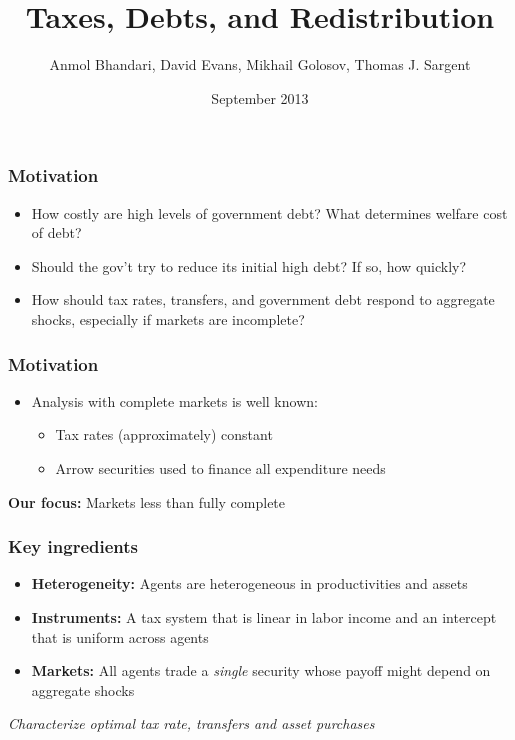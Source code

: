 \documentclass{beamer}
\title {Taxes, Debts,  and Redistribution}
\author{Anmol Bhandari, David Evans, Mikhail Golosov, Thomas J. Sargent}
\date{September 2013}
\begin{document}
%
\begin{frame}
\titlepage

\end{frame}

\begin{frame}
\frametitle{Motivation}

\begin{itemize}
\item How costly are high levels of government debt? What determines welfare cost of debt?
\vspace{2mm}
\item Should the gov't try to reduce its initial high debt? If so, how
quickly?
\vspace{2mm}

\item How should tax rates, transfers, and government debt respond to aggregate shocks, especially if markets are incomplete?
\end{itemize}

\end{frame}

\begin{frame}
\frametitle{Motivation}

\begin{itemize}
\item Analysis with complete markets is well known:

\begin{itemize}
\vspace{2mm}

\item Tax rates (approximately) constant
\vspace{2mm}

\item  Arrow securities used to finance all expenditure needs
\vspace{2mm}

\end{itemize}
\end{itemize}
\vspace{2mm}

\textbf{Our focus:} Markets less than fully complete 

\end{frame}

\begin{frame}
\frametitle{Key ingredients}

\begin{itemize}
\vspace{2mm}
 \item \textbf{Heterogeneity:} Agents are heterogeneous in productivities and assets 
 \item \textbf{Instruments:} A tax system that is linear in labor income and an intercept that is uniform across agents
 \vspace{2mm}
 \item \textbf{Markets:}  All agents trade a \emph{single} security whose payoff might depend on aggregate shocks
\end{itemize}

\emph{Characterize optimal tax rate, transfers and asset purchases}

\end{frame}
\end{document}
